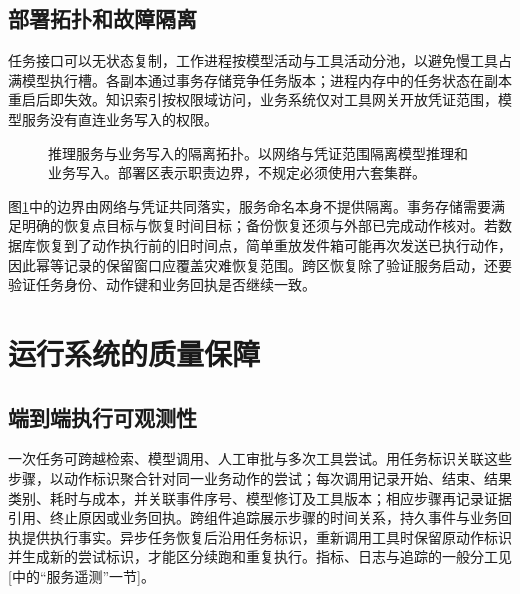 \documentclass[../textbook.tex]{subfiles}
\begin{document}
\subsection{部署拓扑和故障隔离}
任务接口可以无状态复制，工作进程按模型活动与工具活动分池，以避免慢工具占满模型执行槽。各副本通过事务存储竞争任务版本；进程内存中的任务状态在副本重启后即失效。知识索引按权限域访问，业务系统仅对工具网关开放凭证范围，模型服务没有直连业务写入的权限。

\begin{figure}[htbp]
\centering
{}
\caption[推理服务与业务写入的隔离拓扑]{推理服务与业务写入的隔离拓扑。以网络与凭证范围隔离模型推理和业务写入。部署区表示职责边界，不规定必须使用六套集群。}\label{fig:runtime-deployment}
\end{figure}

图\ref{fig:runtime-deployment}中的边界由网络与凭证共同落实，服务命名本身不提供隔离。事务存储需要满足明确的恢复点目标与恢复时间目标；备份恢复还须与外部已完成动作核对。若数据库恢复到了动作执行前的旧时间点，简单重放发件箱可能再次发送已执行动作，因此幂等记录的保留窗口应覆盖灾难恢复范围。跨区恢复除了验证服务启动，还要验证任务身份、动作键和业务回执是否继续一致。

\section{运行系统的质量保障}

\subsection{端到端执行可观测性}
一次任务可跨越检索、模型调用、人工审批与多次工具尝试。用任务标识关联这些步骤，以动作标识聚合针对同一业务动作的尝试；每次调用记录开始、结束、结果类别、耗时与成本，并关联事件序号、模型修订及工具版本；相应步骤再记录证据引用、终止原因或业务回执。跨组件追踪展示步骤的时间关系，持久事件与业务回执提供执行事实。异步任务恢复后沿用任务标识，重新调用工具时保留原动作标识并生成新的尝试标识，才能区分续跑和重复执行。指标、日志与追踪的一般分工见[中的“服务遥测”一节]。
\end{document}
